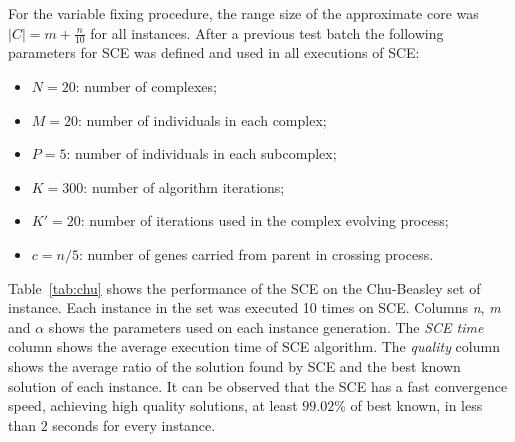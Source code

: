 For the variable fixing procedure, the range size of the approximate core was
$|C| = m+\frac{n}{10}$ for all instances.
After a previous test batch the following parameters for SCE was defined and used
in all executions of SCE:
\begin{itemize}
  \item $N = 20$: number of complexes;
  \item $M = 20$: number of individuals in each complex;
  \item $P = 5$: number of individuals in each subcomplex;
  \item $K = 300$: number of algorithm iterations;
  \item $K' = 20$: number of iterations used in the complex evolving process;
  \item $c = n/5$: number of genes carried from parent in crossing process.
\end{itemize}

Table~\ref{tab:chu} shows the performance of the SCE on the Chu-Beasley set of instance.
Each instance in the set was executed 10 times on SCE.
Columns \textit{n}, \textit{m} and \textit{$\alpha$} shows the parameters used
on each instance generation.
The \textit{SCE time} column shows the average execution time of SCE algorithm.
The \textit{quality} column shows the average ratio of the solution found by SCE and
the best known solution of each instance.
It can be observed that the SCE has a fast convergence speed, achieving high
quality solutions, at least $99.02\%$ of best known, in less than $2$ seconds
for every instance.

